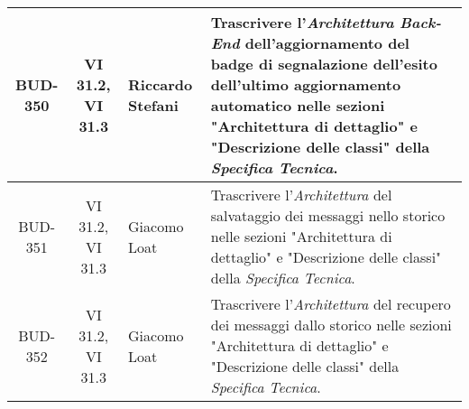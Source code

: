 \begin{table}[htbp]
\begin{tabular}{|c|c|p{}|p{}|}
    \hline
    BUD-350 & VI 31.2, VI 31.3 & Riccardo Stefani & Trascrivere l'\emph{Architettura} \emph{Back-End} dell’aggiornamento del badge di segnalazione dell’esito dell’ultimo aggiornamento automatico nelle sezioni "Architettura di dettaglio" e "Descrizione delle classi" della \emph{Specifica Tecnica}. \\
    \hline
    BUD-351 & VI 31.2, VI 31.3 & Giacomo Loat & Trascrivere l'\emph{Architettura} del salvataggio dei messaggi nello storico nelle sezioni "Architettura di dettaglio" e "Descrizione delle classi" della \emph{Specifica Tecnica}. \\
    \hline
    BUD-352 & VI 31.2, VI 31.3 & Giacomo Loat & Trascrivere l'\emph{Architettura} del recupero dei messaggi dallo storico nelle sezioni "Architettura di dettaglio" e "Descrizione delle classi" della \emph{Specifica Tecnica}. \\
    \hline
\end{tabular}
\end{table}

\vspace{0.5cm}

